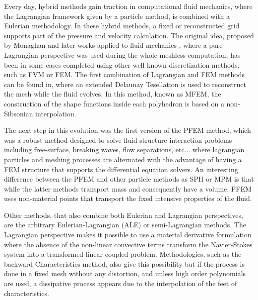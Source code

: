 
Every day, hybrid methods gain traction in computational fluid mechanics, where the Lagrangian framework given by a particle method, is combined with a Eulerian methodology. In these hybrid methods, a fixed or reconstructed grid supports part of the pressure and velocity calculation. The original idea, proposed by Monaghan \cite{Mon77} and later works applied to fluid mechanics \cite{Monaghan88}, where a pure Lagrangian perspective was used during the whole meshless computation, has been in some cases completed using other well known discretization methods, such as FVM\cite{Nestor20091733} or FEM\cite{Ide03}. The first combination of Lagrangian and FEM methods can be found in\cite{Ide03b}, where an extended Delaunay Tesellation is used to reconstruct the mesh while the fluid evolves. In this method, known as MFEM, the construction of the shape functions inside each polyhedron is based on a non-Sibsonian interpolation.

The next step in this evolution was the first version of the PFEM method\cite{Idelsohn04}, which was a robust method designed to solve fluid-structure interaction problems including free-surface, breaking waves, flow separations, etc... where lagrangian particles and meshing processes are alternated with the advantage of having a FEM structure that supports the differential equation solvers. An interesting difference between the PFEM and other particle methods as SPH or MPM\cite{Wieckowsky04} is that while the latter methods transport mass and consequently have a volume, PFEM uses non-material points that transport the fixed intensive properties of the fluid.

Other methods, that also combine both Eulerian and Lagrangian perspectives, are the arbitrary Eulerian-Lagrangian (ALE)\cite{Donea83} or semi-Lagrangian methods\cite{Bermejo}. The Lagrangian perspective makes it possible to use a material derivative formulation where the absence of the non-linear convective terms transform the Navier-Stokes system into a transformed linear coupled problem. Methodologies, such as the backward Characteristics method\cite{Bermejo}, also give this possibility but if the process is done in a fixed mesh without any distortion, and unless high order polynomials are used, a dissipative process appears due to the interpolation of the feet of characteristics.

